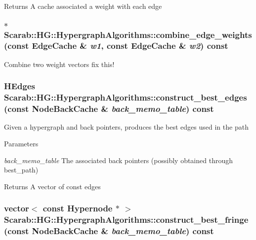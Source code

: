 \begin{DoxyReturn}{Returns}
A cache associated a weight with each edge 
\end{DoxyReturn}
\hypertarget{class_scarab_1_1_h_g_1_1_hypergraph_algorithms_ae815dc19968e9ab557d19dd2563fca38}{
\subsubsection[{combine\_\-edge\_\-weights}]{ $\ast$ Scarab::HG::HypergraphAlgorithms::combine\_\-edge\_\-weights (const {\bf EdgeCache} \& {\em w1}, \/  const {\bf EdgeCache} \& {\em w2}) const}}
\label{class_scarab_1_1_h_g_1_1_hypergraph_algorithms_ae815dc19968e9ab557d19dd2563fca38}
Combine two weight vectors fix this! \hypertarget{class_scarab_1_1_h_g_1_1_hypergraph_algorithms_ab054762a5d6a0af7ee667c8e90585668}{
\subsubsection[{construct\_\-best\_\-edges}]{\setlength{\rightskip}{0pt plus 5cm}HEdges Scarab::HG::HypergraphAlgorithms::construct\_\-best\_\-edges (const {\bf NodeBackCache} \& {\em back\_\-memo\_\-table}) const}}
\label{class_scarab_1_1_h_g_1_1_hypergraph_algorithms_ab054762a5d6a0af7ee667c8e90585668}
Given a hypergraph and back pointers, produces the best edges used in the path 
\begin{DoxyParams}{Parameters}
\item[{\em back\_\-memo\_\-table}]The associated back pointers (possibly obtained through best\_\-path) \end{DoxyParams}
\begin{DoxyReturn}{Returns}
A vector of const edges 
\end{DoxyReturn}
\hypertarget{class_scarab_1_1_h_g_1_1_hypergraph_algorithms_af5bcb325e1d58dd9d4c26517c4dfeca0}{
\subsubsection[{construct\_\-best\_\-fringe}]{\setlength{\rightskip}{0pt plus 5cm}vector$<$ const {\bf Hypernode} $\ast$ $>$ Scarab::HG::HypergraphAlgorithms::construct\_\-best\_\-fringe (const {\bf NodeBackCache} \& {\em back\_\-memo\_\-table}) const}}
